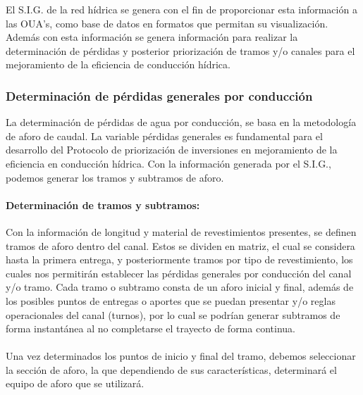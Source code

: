 \documentclass[]{article}
\begin{document}
El S.I.G. de la red hídrica se genera con el fin de proporcionar esta información a las OUA’s, como base de datos en formatos que permitan su visualización. Además con esta información se genera información para realizar la determinación de pérdidas y posterior priorización de tramos y/o canales para el mejoramiento de la eficiencia de conducción hídrica.

\subsubsection{Determinación de pérdidas generales por conducción}

La determinación de pérdidas de agua por conducción, se basa en la metodología de aforo de caudal. La variable pérdidas generales es fundamental para el desarrollo del Protocolo de priorización de inversiones en mejoramiento de la eficiencia en conducción hídrica. Con la información generada por el S.I.G., podemos generar los tramos y subtramos de aforo.

\paragraph{Determinación de tramos y subtramos:} Con la información de longitud y material de revestimientos presentes, se definen tramos de aforo dentro del canal. Estos se dividen en matriz, el cual se considera hasta la primera entrega, y posteriormente tramos por tipo de revestimiento, los cuales nos permitirán establecer las pérdidas generales por conducción del canal y/o tramo. Cada tramo o subtramo consta de un aforo inicial y final, además de los posibles puntos de entregas o aportes que se puedan presentar y/o reglas operacionales del canal (turnos), por lo cual se podrían generar subtramos de forma instantánea al no completarse el trayecto de forma continua.\\
\\
Una vez determinados los puntos de inicio y final del tramo, debemos seleccionar la sección de aforo, la que dependiendo de sus características, determinará el equipo de aforo que se utilizará. 
\end{document}
